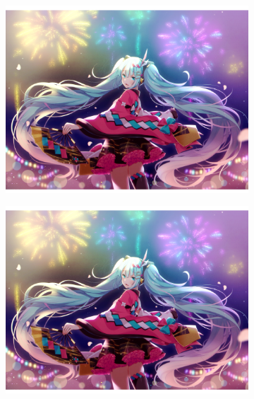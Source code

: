 \documentclass[UTF8]{ctexart}
\begin{document}
	\begin{figure}[htbp]
		\centering
		\begin{subfigure}{0.45\textwidth}
			\centering
			\includegraphics[scale=0.4]{figures/miku-01.png}
		\end{subfigure}
		\qquad
		\begin{subfigure}{0.45\textwidth}
			\centering
			\includegraphics[scale=0.4]{figures/miku-01.png}
		\end{subfigure}
	\end{figure}
\end{document}
